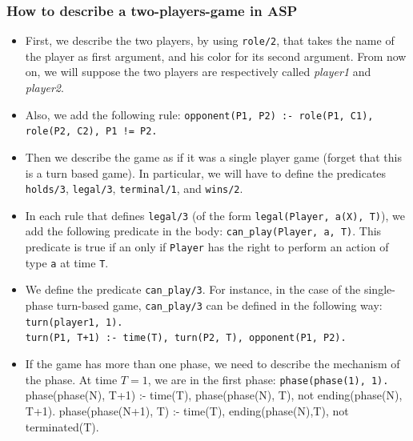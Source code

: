 \documentclass[12pt,twoside]{report}
\begin{document}
\subsubsection{How to describe a two-players-game in ASP}

\begin{itemize}



\item First, we describe the two players, by using \texttt{role/2}, that takes the name of the player as first argument, and his color for its second argument. From now on, we will suppose the two players are respectively called \textit{player1} and \textit{player2}.  

\item Also, we add the following rule: \newline
\texttt{opponent(P1, P2) :- role(P1, C1), role(P2, C2), P1 != P2.}

\item Then we describe the game as if it was a single player game \citep{thielscher2009answer} (forget that this is a turn based game). In particular, we will have to define the predicates \texttt{holds/3}, \texttt{legal/3}, \texttt{terminal/1}, and \texttt{wins/2}.

\item In each rule that defines \texttt{legal/3} (of the form \texttt{legal(Player, a(X), T)}), we add the following predicate in the body: \texttt{can\_play(Player, a, T)}. This predicate is true if an only if \texttt{Player} has the right to perform an action of type \texttt{a} at time \texttt{T}. 

\item We define the predicate \texttt{can\_play/3}. For instance, in the case of the single-phase turn-based game, \texttt{can\_play/3} can be defined in the following way:\newline
\texttt{turn(player1, 1). }\\
\texttt{turn(P1, T+1) :- time(T), turn(P2, T), opponent(P1, P2).}

\item If the game has more than one phase, we need to describe the mechanism of the phase. At time $T=1$, we are in the first phase:\newline
\texttt{phase(phase(1), 1).}\\


phase(phase(N), T+1) :- time(T), phase(phase(N), T), not ending(phase(N), T+1).
phase(phase(N+1), T) :- time(T), ending(phase(N),T), not terminated(T).

\end{itemize}
\end{document}
